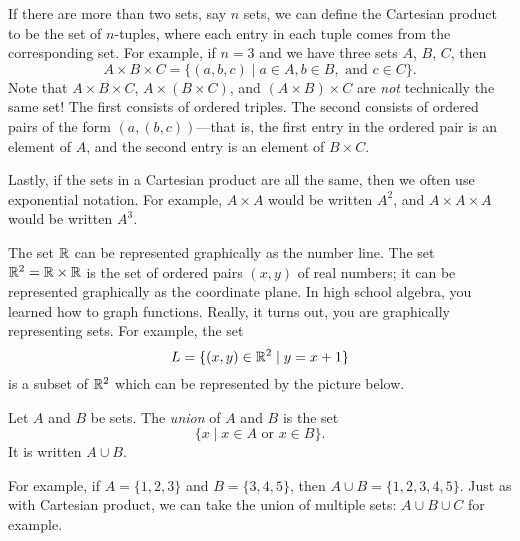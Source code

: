 \documentclass{tufte-book}
\begin{document}
If there are more than two sets, say $n$ sets, we can define the Cartesian product to be the set of $n$-tuples, where each entry in each tuple comes from the corresponding set. For example, if $n = 3$ and we have three sets $A$, $B$, $C$, then
\[
A \times B \times C = \{(a, b, c) \mid a \in A, b \in B, \text{ and } c \in C\}.
\]
Note that $A \times B \times C$, $A \times (B \times C)$, and $(A \times B) \times C$ are \emph{not} technically the same set! The first consists of ordered triples. The second consists of ordered pairs of the form $(a, (b, c))$---that is, the first entry in the ordered pair is an element of $A$, and the second entry is an element of $B \times C$.

Lastly, if the sets in a Cartesian product are all the same, then we often use exponential notation. For example, $A \times A$ would be written $A^2$, and $A \times A \times A$ would be written $A^3$.

\begin{example}
  The set $\mathbb{R}$ can be represented graphically as the number line. The set $\mathbb{R}^2 = \mathbb{R} \times \mathbb{R}$ is the set of ordered pairs $(x, y)$ of real numbers; it can be represented graphically as the coordinate plane. In high school algebra, you learned how to graph functions. Really, it turns out, you are graphically representing sets. For example, the set
  \[
  L = \{(x,y) \in \mathbb{R}^2 \mid y = x + 1\}
  \]
  is a subset of $\mathbb{R}^2$ which can be represented by the picture below.
    \begin{center}
  \end{center}

\end{example}

\begin{definition}
  Let $A$ and $B$ be sets. The \emph{union} of $A$ and $B$ is the set
  \[
  \{x \mid x \in A \text{ or } x \in B\}.
  \]
  It is written $A \cup B$.
\end{definition}
For example, if $A = \{1, 2, 3\}$ and $B = \{3, 4, 5\}$, then $A \cup B = \{1, 2, 3, 4, 5\}$. Just as with Cartesian product, we can take the union of multiple sets: $A \cup B \cup C$ for example. 
\end{document}
